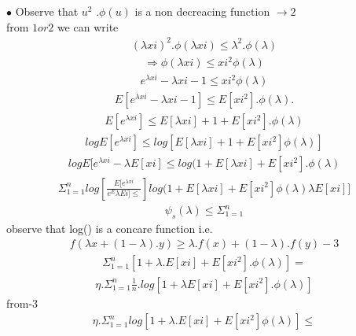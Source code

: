 \documentclass[journal,12pt,twocolumn]{IEEEtran}
\begin{document}
$\bullet$ Observe that $u^2$ .$\phi(u)$ is a non decreacing function $\rightarrow 2$\\

from $1 or 2$ we can write \\
\begin{align}
(\lambda xi)^2. \phi(\lambda xi)\leqslant \lambda^2. \phi(\lambda)
\end{align}
\begin{align}
\Rightarrow \phi(\lambda xi)\leqslant xi^2 \phi (\lambda)
\end{align}
\begin{align}
e^{\lambda xi}-\lambda xi-1 \leqslant xi^2 \phi (\lambda)
\end{align}
\begin{align}
E[e^{\lambda xi}-\lambda xi -1]\leqslant E[xi^2].\phi(\lambda).
\end{align}
\begin{align}
E[e^{\lambda xi}]\leqslant E[\lambda xi]+1+E[xi^2].\phi (\lambda)
\end{align}
\begin{align}
log E[e^{\lambda xi}]\leqslant log [E[\lambda xi]+1+E[xi^2] \phi (\lambda)]
\end{align}
\begin{align}
log E[e^{\lambda xi}- \lambda E[xi]\leqslant log(1+E[\lambda xi]+ E[xi^2].\phi (\lambda)
\end{align}
\begin{align}
\Sigma_{1=1}^{n} log [\frac{E[e^{\lambda xi}}{e^E{\lambda Ei}]\leqslant}] log (1+E[\lambda xi]+E[xi^2] \phi (\lambda) \lambda E[xi]]
\end{align}
\begin{align}
\psi_s(\lambda)\leqslant \Sigma_{1=1}^{n}
\end{align}
observe that log() is a concare function i.e.\\
\begin{align}
f(\lambda x+(1-\lambda). y) \geqslant \lambda. f(x)+(1-\lambda).f(y)-3
\end{align}
\begin{align}
\Sigma_{1=1}^{n}[1+\lambda .E[xi]+ E[xi^2].\phi (\lambda)]=
\end{align}
\begin{align}
\eta. \Sigma_{1=1}^{n} \frac{1}{n}.log [1+\lambda E[xi]+E[xi^2].\phi (\lambda)]
\end{align}
from-3
\begin{align}
\eta. \Sigma_{1=1}^{n} log[1+\lambda .E[xi]+E[xi^2]\phi (\lambda)]\leqslant
\end{align}
\end{document}
